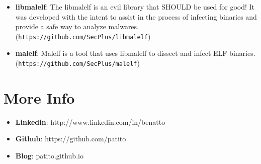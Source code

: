 \documentclass[margin]{res}
\begin{document}
\begin{resume}
\begin{itemize}
		    \item \textbf{libmalelf}: The libmalelf is an evil library that SHOULD be used for good! It was developed
		                              with the intent to assist in the process of infecting binaries and provide a safe 
		                              way to analyze malwares. (\texttt{https://github.com/SecPlus/libmalelf})\vspace{1mm}
		                              
		    \item \textbf{malelf}: Malelf is a tool that uses libmalelf to dissect and infect ELF binaries. 
		                           (\texttt{https://github.com/SecPlus/malelf})
		\end{itemize}
 
\section{More Info}
    \begin{itemize}
        \item \textbf{Linkedin}: http://www.linkedin.com/in/benatto
        \item \textbf{Github}: https://github.com/patito
        \item \textbf{Blog}: patito.github.io
    \end{itemize}


\end{resume} 
\end{document}
